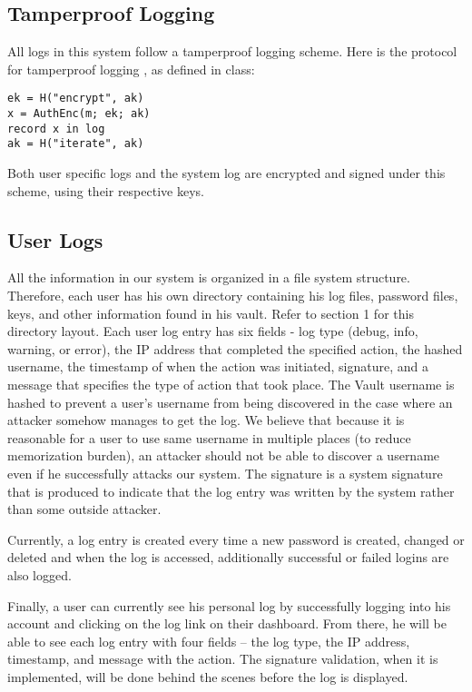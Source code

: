 \documentclass{article}
\begin{document}
\subsection{Tamperproof Logging}
\par All logs in this system follow a tamperproof logging scheme. Here is the protocol for tamperproof logging \cite{bib:TamperProof}, as defined in class:
\begin{lstlisting}[caption={Tamperproof Logging},label={lst:tamperproof_logging},style=Pseudocode]
ek = H("encrypt", ak)
x = AuthEnc(m; ek; ak)
record x in log
ak = H("iterate", ak)
\end{lstlisting}
Both user specific logs and the system log are encrypted and signed under this scheme, using their respective keys.

\subsection{User Logs}
\par All the information in our system is organized in a file system structure. Therefore, each user has his own directory containing his log files, password files, keys, and other information found in his vault. Refer to section 1 for this directory layout. Each user log entry has six fields - log type (debug, info, warning, or error), the IP address that completed the specified action, the hashed username, the timestamp of when the action was initiated, signature, and a message that specifies the type of action that took place. The Vault username is hashed to prevent a user's username from being discovered in the case where an attacker somehow manages to get the log. We believe that because it is reasonable for a user to use same username in multiple places (to reduce memorization burden), an attacker should not be able to discover a username even if he successfully attacks our system. The signature is a system signature that is produced to indicate that the log entry was written by the system rather than some outside attacker.

\par Currently, a log entry is created every time a new password is created, changed or deleted and when the log is accessed, additionally successful or failed logins are also logged.

\par Finally, a user can currently see his personal log by successfully logging into his account and clicking on the log link on their dashboard. From there, he will be able to see each log entry with four fields – the log type, the IP address, timestamp, and message with the action. The signature validation, when it is implemented, will be done behind the scenes before the log is displayed.
\end{document}
